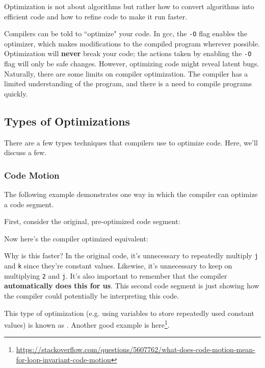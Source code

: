 Optimization is not about algorithms but rather how to convert algorithms into efficient code and how to refine code to make it run faster. 


Compilers can be told to ``optimize" your code. In gcc, the \verb!-O! flag enables the optimizer, which makes modifications to the compiled program wherever possible. Optimization will \textbf{never} break your code; the actions taken by enabling the \verb!-O! flag will only be safe changes. However, optimizing code might reveal latent bugs. Naturally, there are some limits on compiler optimization. The compiler has a limited understanding of the program, and there is a need to compile programs quickly. 


\subsection{Types of Optimizations}
There are a few types techniques that compilers use to optimize code. Here, we'll discuss a few. 

\subsubsection{Code Motion}
The following example demonstrates one way in which the compiler can optimize a code segment.

First, consider the original, pre-optimized code segment:

\lstset{
caption=Unoptimized Compiler Code
}
\begin{center}

\end{center}

Now here's the compiler optimized equivalent:

\lstset{
caption=Optimized Compiler Code
}
\begin{center}

\end{center}

Why is this faster? In the original code, it's unnecessary to repeatedly multiply \verb!j! and \verb!k! since they're constant values. Likewise, it's unnecessary to keep on multiplying \verb!2! and \verb!j!. It's also important to remember that the compiler \textbf{automatically does this for us}. This second code segment is just showing how the compiler could potentially be interpreting this code. 

This type of optimization (e.g. using variables to store repeatedly used constant values) is known as . Another good example is here\footnote{\url{https://stackoverflow.com/questions/5607762/what-does-code-motion-mean-for-loop-invariant-code-motion}}.


